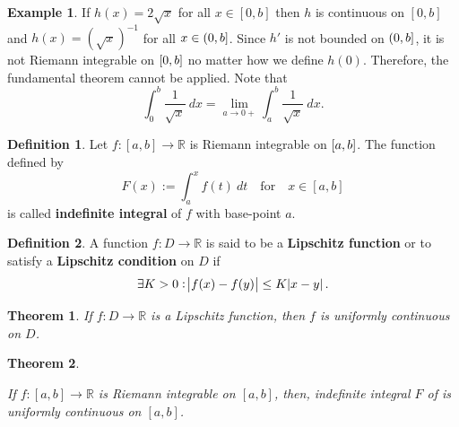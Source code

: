 \documentclass[12pt,openany]{book}
\newtheorem{theorem}{Theorem}[chapter]
\theoremstyle{definition}
\newtheorem{definition}{Definition}[chapter]
\newtheorem{example}{Example}[chapter]
\newcommand{\R}{\mathbb{R}}
\begin{document}
	\begin{example}
		If $h(x)=2\sqrt{x}$ for all $x\in[0,b]$ then $h$ is continuous on $[0,b]$ and $h(x)=(\sqrt{x})^{-1}$ for all $x\in\intoc{0,b}$. Since $h'$ is not bounded on $\intoc{0,b}$, it is not Riemann integrable on $\intcc{0,b}$ no matter how we define $h(0)$. Therefore, the fundamental theorem cannot be applied. Note that \[
		\int_0^b\frac{1}{\sqrt{x}}\ dx = \lim\limits_{a\to 0+}\int_a^b\frac{1}{\sqrt{x}}\ dx.
		\]
	\end{example}
	
	\newpage
	\begin{tcolorbox}[colframe=defcolor, title={\color{white}\bf Indefinite Integral}]
		\begin{definition}
			Let \(f:[a,b]\to\R\) is Riemann integrable on \(\sbr{a,b}\).
			The function defined by \[
			F(x):=\int_a^xf(t)\ dt\quad\text{for}\quad x\in[a,b]
			\] is called \textbf{indefinite integral} of \(f\) with base-point \(a\).
		\end{definition}
	\end{tcolorbox}
	\vspace{10pt}
	\begin{tcolorbox}[colframe=defcolor!50!white, title={\color{white}\bf Lipschitz Function}]
		\begin{definition}
			A function \(f:D\to\R\) is said to be a \textbf{Lipschitz function} or to satisfy a \textbf{Lipschitz condition} on \(D\) if \[
			\exists K>0:\abs{f(x)-f(y)}\leq K\abs{x-y}.
			\]
		\end{definition}
	\end{tcolorbox}
	\begin{tcolorbox}[colframe=thmcolor!50!white, title={\color{white}\bf }]
		\begin{theorem}
			If $f:D\to\R$ is a Lipschitz function, then $f$ is uniformly continuous on $D$.
		\end{theorem}
	\end{tcolorbox}
	\vspace{20pt}
	\begin{tcolorbox}[colframe=thmcolor, title={\color{white}\bf }]
		\begin{theorem}\hypertarget{thm2.13}{}
			If $f:[a,b]\to\R$ is Riemann integrable on $[a,b]$, then, indefinite integral $F$ of is uniformly continuous on $[a,b]$.
		\end{theorem}
	\end{tcolorbox}
\end{document}

